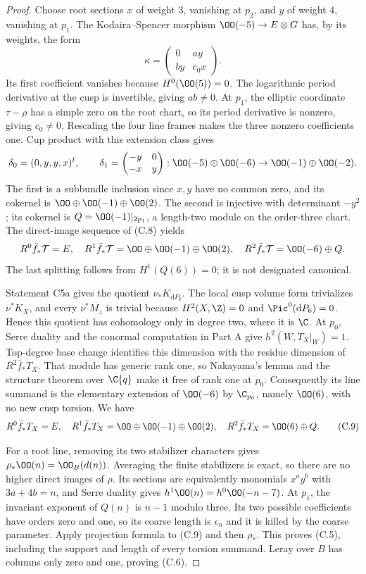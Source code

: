 \begin{proof}
Choose root sections $x$ of weight $3$, vanishing at $p_2$, and $y$ of weight $4$, vanishing at $p_1$. The Kodaira--Spencer morphism $\OO(-5)\to E\otimes G$ has, by its weights, the form
\[
 \kappa=\begin{pmatrix}0&a y\\b y&c_0x\end{pmatrix}.
\]
Its first coefficient vanishes because $H^0(\OO(5))=0$. The logarithmic period derivative at the cusp is invertible, giving $ab\ne0$. At $p_1$, the elliptic coordinate $\tau-\rho$ has a simple zero on the root chart, so its period derivative is nonzero, giving $c_0\ne0$. Rescaling the four line frames makes the three nonzero coefficients one. Cup product with this extension class gives
\[
\delta_0=(0,y,y,x)^t,\qquad
\delta_1=\begin{pmatrix}-y&0\\-x&y\end{pmatrix}:
 \OO(-5)\oplus\OO(-6)\to\OO(-1)\oplus\OO(-2).
\]
The first is a subbundle inclusion since $x,y$ have no common zero, and its cokernel is $\OO\oplus\OO(-1)\oplus\OO(2)$. The second is injective with determinant $-y^2$; its cokernel is
$Q=\OO(-1)|_{2p_1}$, a length-two module on the order-three chart. The direct-image sequence of (C.8) yields
\[
 R^0\bar f_*\mathcal T=E,\quad
 R^1\bar f_*\mathcal T=\OO\oplus\OO(-1)\oplus\OO(2),\quad
 R^2\bar f_*\mathcal T=\OO(-6)\oplus Q.
\]
The last splitting follows from $H^1(Q(6))=0$; it is not designated canonical.

Statement C5a gives the quotient $\nu_*K_{\mathrm dP_6}$. The local cusp volume form trivializes $\nu^*K_X$, and every $\nu^*M_z$ is trivial because $H^2(X,\Z)=0$ and $\Pic^0(\mathrm dP_6)=0$. Hence this quotient has cohomology only in degree two, where it is $\C$. At $p_0$, Serre duality and the conormal computation in Part A give $h^2(W,T_X|_W)=1$. Top-degree base change identifies this dimension with the residue dimension of $R^2\bar f_*T_X$. That module has generic rank one, so Nakayama's lemma and the structure theorem over $\C\{q\}$ make it free of rank one at $p_0$. Consequently its line summand is the elementary extension of $\OO(-6)$ by $\C_{p_0}$, namely $\OO(6)$, with no new cusp torsion. We have
\[
 R^0\bar f_*T_X=E,\quad
 R^1\bar f_*T_X=\OO\oplus\OO(-1)\oplus\OO(2),\quad
 R^2\bar f_*T_X=\OO(6)\oplus Q.                       \tag{C.9}
\]

For a root line, removing its two stabilizer characters gives
$\rho_*\OO(n)=\OO_B(d(n))$. Averaging the finite stabilizers is exact, so there are no higher direct images of $\rho$. Its sections are equivalently monomials $x^ay^b$ with $3a+4b=n$, and Serre duality gives $h^1\OO(n)=h^0\OO(-n-7)$. At $p_1$, the invariant exponent of $Q(n)$ is $n-1$ modulo three. Its two possible coefficients have orders zero and one, so its coarse length is $\epsilon_n$ and it is killed by the coarse parameter. Apply projection formula to (C.9) and then $\rho_*$. This proves (C.5), including the support and length of every torsion summand. Leray over $B$ has columns only zero and one, proving (C.6).


\end{proof}
